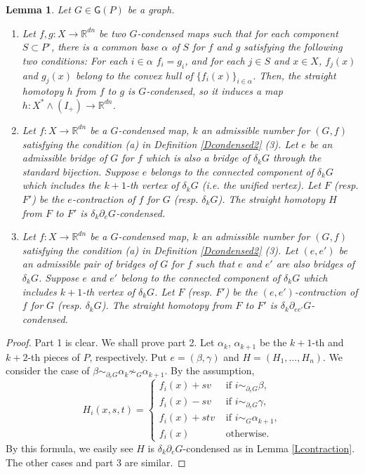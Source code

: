 \documentclass[reqno]{amsart}
\theoremstyle{definition}
\theoremstyle{plain}
\newtheorem{lem}[defi]{Lemma}
\newcommand{\GG}{\mathsf{G}}%
\newcommand{\RR}{\mathbb{R}}
\begin{document}
\begin{lem}\label{Lstraight_homotopy} Let $G\in\GG(P)$ be a graph.
\begin{enumerate} 
\item Let $f,g:X\to \RR^{dn}$ be  two $G$-condensed maps such that for each  component $S\subset P^\circ$, there is a common base $\alpha$ of $S$ for $f$ and $g$   satisfying the following two conditions: For each $i\in \alpha$  $f_i=g_i$, and for each $j\in S$ and $x\in X$, $f_j(x)$ and $g_j(x)$ belong to the convex hull of $\{f_i(x)\}_{i\in \alpha}$.
Then, the straight homotopy $h$ from $f$ to $g$ is $G$-condensed, so it induces a map
$h:X^*\wedge (I_+)\to \RR^{dn}$. 
\item Let $f:X\to \RR^{dn}$ be a $G$-condensed map, $k$ an admissible number for $(G,f)$ satisfying the condition (a) in Definition \ref{Dcondensed2} (3). Let $e$ be an admissible bridge of $G$ for $f$ which is also a bridge of $\delta_kG$ through the standard bijection. Suppose   $e$ belongs to the connected component of $\delta_kG$ which includes the $k+1$-th vertex of $\delta_kG$ (i.e. the unified vertex). Let $F$ (resp. $F'$) be the $e$-contraction of  $f$ for $G$ (resp. $\delta_kG$). The straight homotopy $H$ from $F$ to $F'$ is $\delta_k\partial_eG$-condensed. 
\item Let $f:X\to \RR^{dn}$ be a $G$-condensed map, $k$ an admissible number for $(G,f)$ satisfying the condition (a) in Definition \ref{Dcondensed2} (3). Let $(e,e') $ be an admissible pair of bridges of $G$ for $f$ such that $e$ and $e'$ are also bridges of $\delta_kG$. Suppose $e$ and $e'$ belong to the  connected component of $\delta_kG$ which includes $k+1$-th vertex of $\delta_kG$.  Let $F$ (resp. $F'$) be the $(e,e')$-contraction of  $f$ for $G$ (resp. $\delta_kG$). The straight homotopy from $F$ to $F'$ is $\delta_k\partial_{ee'}G$-condensed.

\end{enumerate}
\end{lem}
\begin{proof}
Part 1 is clear. We shall prove part 2. Let $\alpha_k$, $\alpha_{k+1}$ be the $k+1$-th and $k+2$-th pieces of $P$, respectively. Put $e=(\beta, \gamma)$ and $H=(H_1,\dots, H_n)$. We consider the case of $\beta\sim_{\partial_eG}\alpha_k\not\sim_G\alpha_{k+1}$.  By the assumption, 
\[
H_i(x,s,t)=
\left\{
\begin{array}{cc}
f_i(x)+sv & \text{ if }i\sim_{\partial_eG}\beta,\\
f_i(x)-sv & \text{ if }i\sim_{\partial_eG}\gamma,\\
f_i(x)+stv & \text{ if }i\sim_G\alpha_{k+1},\\
f_i(x) & \text{ otherwise. }
\end{array}
\right.
\]
By this formula, we easily see $H$ is $\delta_k\partial_eG$-condensed as in Lemma \ref{Lcontraction}. The other cases and part 3 are similar.
\end{proof}
\end{document}
